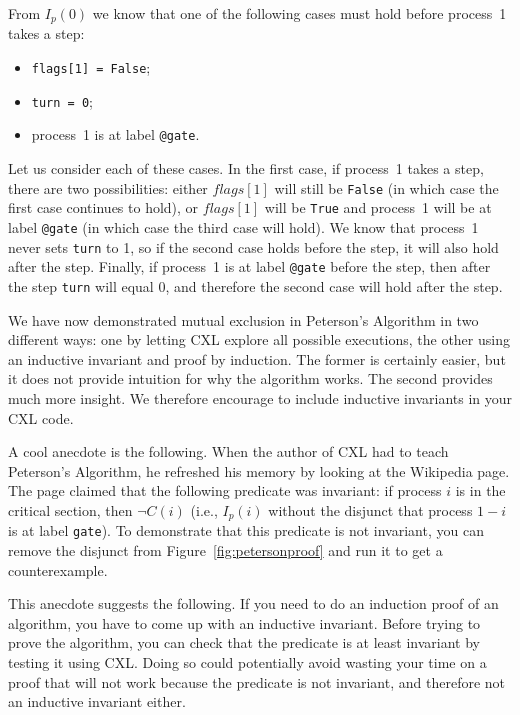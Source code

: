 \documentclass{report}
\begin{document}
From $I_p(0)$ we know that one of the following cases must hold before
process~1 takes a step:
\begin{itemize}
\item \texttt{flags[1] = False};
\item \texttt{turn = 0};
\item process~1 is at label \texttt{@gate}.
\end{itemize}

Let us consider each of these cases.
In the first case, if process~1 takes a step, there are two possibilities:
either $flags[1]$ will still be \texttt{False} (in which case the first case
continues to hold), or $flags[1]$ will be \texttt{True}
and process~1 will be at label \texttt{@gate} (in which case the third case
will hold).
We know that process~1 never sets \texttt{turn} to 1, so
if the second case holds before the step, it will also hold after the step.
Finally, if process~1 is at label \texttt{@gate} before the step, then after
the step \texttt{turn} will equal 0, and therefore the second case will hold
after the step.

We have now demonstrated mutual exclusion in Peterson's Algorithm in two
different ways: one by letting CXL explore all possible executions, the
other using an inductive invariant and proof by induction.  The former
is certainly easier, but it does not provide intuition for why the
algorithm works.  The second provides much more insight.  We therefore
encourage to include inductive invariants in your CXL code.

A cool anecdote is the following.  When the author of CXL had to teach
Peterson's Algorithm, he refreshed his memory by looking at the Wikipedia
page.  The page claimed that the following predicate was invariant:
if process $i$ is in the critical section, then $\lnot C(i)$ (i.e.,
$I_p(i)$ without the disjunct that process $1-i$ is at label \texttt{gate}).
To demonstrate that this predicate is not invariant, you can remove the
disjunct from Figure~\ref{fig:petersonproof} and run it to get a
counterexample.

This anecdote suggests the following.  If you need to do an induction
proof of an algorithm, you have to come up with an inductive invariant.
Before trying to prove the algorithm, you can check that the predicate is
at least invariant by testing it using CXL.  Doing so could potentially
avoid wasting your time on a proof that will not work because the
predicate is not invariant, and therefore not an inductive invariant either.
\end{document}
